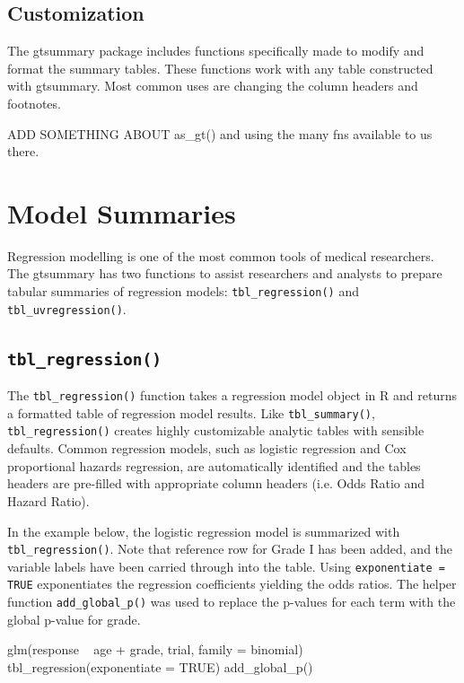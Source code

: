 \subsection{Customization}

The gtsummary package includes functions specifically made to modify and format the summary tables.
These functions work with any table constructed with gtsummary.
Most common uses are changing the column headers and footnotes.



ADD SOMETHING ABOUT as\_gt() and using the many fns available to us there.

\section{Model Summaries}

Regression modelling is one of the most common tools of medical researchers.
The gtsummary has two functions to assist researchers and analysts to prepare tabular summaries of regression models: \texttt{tbl\_regression()} and \texttt{tbl\_uvregression()}.

\subsection{\texorpdfstring{\texttt{tbl\_regression()}}{tbl\_regression()}}

The \texttt{tbl\_regression()} function takes a regression model object in R and returns a formatted table of regression model results. 
Like \texttt{tbl\_summary()}, \texttt{tbl\_regression()} creates highly customizable analytic tables with sensible defaults.
Common regression models, such as logistic regression and Cox proportional hazards regression, are automatically identified and the tables headers are pre-filled with appropriate column headers (i.e. Odds Ratio and Hazard Ratio).

In the example below, the logistic regression model is summarized with \texttt{tbl\_regression()}.
Note that reference row for Grade I has been added, and the variable labels have been carried through into the table.
Using \texttt{exponentiate = TRUE} exponentiates the regression coefficients yielding the odds ratios.
The helper function \texttt{add\_global\_p()} was used to replace the p-values for each term with the global p-value for grade.

\begin{example}
glm(response ~ age + grade, trial, family = binomial) %
  tbl_regression(exponentiate = TRUE) %
  add_global_p()
\end{example}

